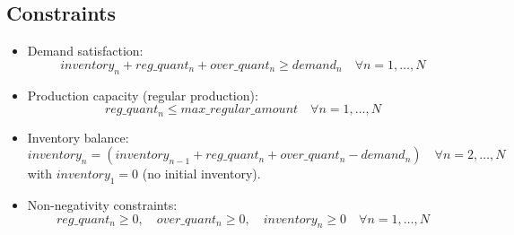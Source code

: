\documentclass{article}
\begin{document}
\subsection*{Constraints}
\begin{itemize}
    \item Demand satisfaction:
    \[
    inventory_n + reg\_quant_n + over\_quant_n \geq demand_n \quad \forall n = 1, \ldots, N
    \]
    
    \item Production capacity (regular production):
    \[
    reg\_quant_n \leq max\_regular\_amount \quad \forall n = 1, \ldots, N
    \]

    \item Inventory balance:
    \[
    inventory_n = (inventory_{n-1} + reg\_quant_n + over\_quant_n - demand_n) \quad \forall n = 2, \ldots, N
    \]
    with \( inventory_1 = 0 \) (no initial inventory).

    \item Non-negativity constraints:
    \[
    reg\_quant_n \geq 0, \quad over\_quant_n \geq 0, \quad inventory_n \geq 0 \quad \forall n = 1, \ldots, N
    \]
\end{itemize}
\end{document}
